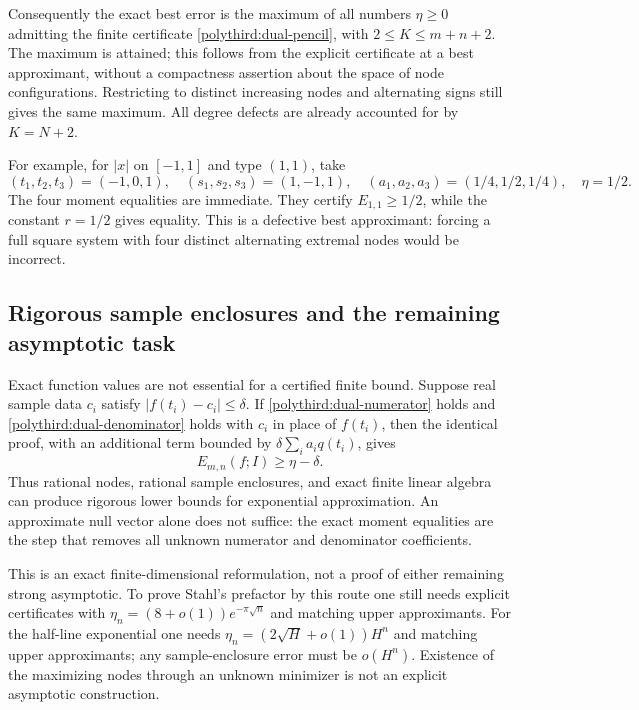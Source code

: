 \documentclass[11pt]{article}
\theoremstyle{remark}
\numberwithin{equation}{section}
\begin{document}
Consequently the exact best error is the maximum of all numbers
$\eta\ge0$ admitting the finite certificate
\eqref{polythird:dual-pencil}, with $2\le K\le m+n+2$.
The maximum is attained; this follows from the explicit certificate
at a best approximant, without a compactness assertion about the
space of node configurations.  Restricting to distinct increasing
nodes and alternating signs still gives the same maximum.
All degree defects are already accounted for by $K=N+2$.

For example, for $|x|$ on $[-1,1]$ and type $(1,1)$, take
\[
 (t_1,t_2,t_3)=(-1,0,1),\quad
 (s_1,s_2,s_3)=(1,-1,1),\quad
 (a_1,a_2,a_3)=(1/4,1/2,1/4),\quad \eta=1/2.
\]
The four moment equalities are immediate.  They certify
$E_{1,1}\ge1/2$, while the constant $r=1/2$ gives equality.
This is a defective best approximant: forcing a full square system
with four distinct alternating extremal nodes would be incorrect.

\subsection{Rigorous sample enclosures and the remaining asymptotic task}
Exact function values are not essential for a certified finite bound.
Suppose real sample data $c_i$ satisfy $|f(t_i)-c_i|\le\delta$.
If \eqref{polythird:dual-numerator} holds and
\eqref{polythird:dual-denominator} holds with $c_i$ in place of
$f(t_i)$, then the identical proof, with an additional term bounded
by $\delta\sum_i a_iq(t_i)$, gives
\begin{equation}\label{polythird:dual-enclosures}
 E_{m,n}(f;I)\ge\eta-\delta.
\end{equation}
Thus rational nodes, rational sample enclosures, and exact finite
linear algebra can produce rigorous lower bounds for exponential
approximation.  An approximate null vector alone does not suffice:
the exact moment equalities are the step that removes all unknown
numerator and denominator coefficients.

This is an exact finite-dimensional reformulation, not a proof of
either remaining strong asymptotic.  To prove Stahl's prefactor by
this route one still needs explicit certificates with
$\eta_n=(8+o(1))e^{-\pi\sqrt n}$ and matching upper approximants.
For the half-line exponential one needs
$\eta_n=(2\sqrt H+o(1))H^n$ and matching upper approximants; any
sample-enclosure error must be $o(H^n)$.  Existence of the maximizing
nodes through an unknown minimizer is not an explicit asymptotic
construction.
\end{document}
